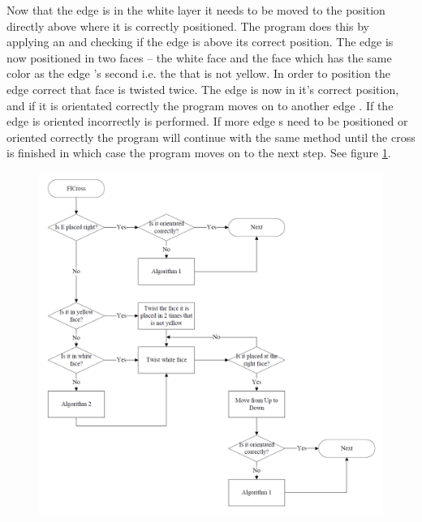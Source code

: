 Now that the edge \cpiece{} is in the white layer it needs to be moved to the position directly above where it is correctly positioned. 
The program does this by applying an  \twist{} and checking if the edge \cpiece{} is above its correct position.
The edge \cpiece{} is now positioned in two faces -- the white face and the face which has the same color as the edge  \cpiece{}'s second \facelet{} i.e. the \facelet{} that is not yellow.
In order to position the edge \cpiece{} correct that face is twisted twice.
The edge \cpiece{} is now in it's correct position, and if it is orientated correctly the program moves on to another edge  \cpiece{} .
If the edge \cpiece{} is oriented incorrectly  is performed. If more edge \cpiece{}s need to be positioned or oriented correctly the program will continue with the same method until the cross is finished in which case the program moves on to the next step. See figure \ref{fig:FlCrossFlow}.

\begin{figure}[htbp]
	\centering
		\includegraphics[width = \textwidth]{input/pics/FlCrossFlow3.png}
	\caption{}
	\label{fig:FlCrossFlow}
\end{figure}

